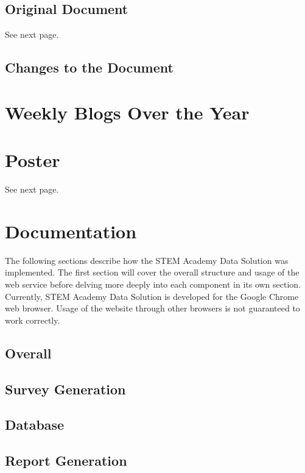 \documentclass[letterpaper,10pt,serif,draftclsnofoot,onecolumn,compsoc,titlepage]{IEEEtran}
\begin{document}
\subsection{Original Document}
See next page. \\

\subsection{Changes to the Document}


\section{Weekly Blogs Over the Year}




\section{Poster}
See next page. \\

\section{Documentation}
The following sections describe how the STEM Academy Data Solution was implemented.
The first section will cover the overall structure and usage of the web service before delving more deeply into each component in its own section.
Currently, STEM Academy Data Solution is developed for the Google Chrome web browser.
Usage of the website through other browsers is not guaranteed to work correctly.
\subsection{Overall}

\subsection{Survey Generation}

\subsection{Database}

\subsection{Report Generation}

\end{document}
